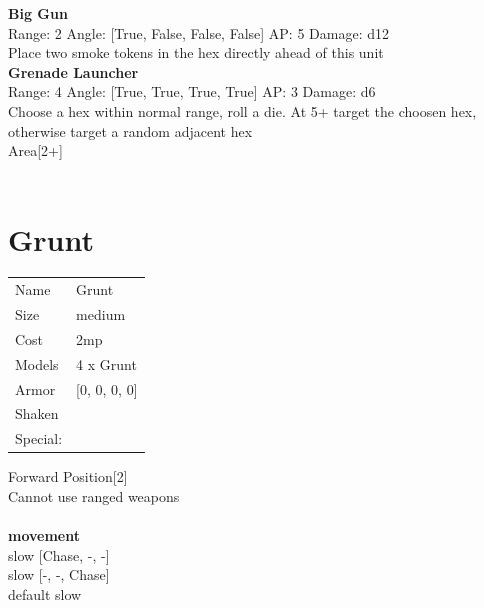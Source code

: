 {\bf Big Gun } \\



Range: 2  Angle: [True, False, False, False] AP: 5 Damage: d12 \\
Place two smoke tokens in the hex directly ahead of this unit\\ 




{\bf Grenade Launcher } \\



Range: 4  Angle: [True, True, True, True] AP: 3 Damage: d6 \\
Choose a hex within normal range, roll a die. At 5+ target the choosen hex, otherwise target a random adjacent hex\\ 
Area[2+]\\ 




 
\ \\













\clearpage

\section{ Grunt }

\begin{tabular}{ll}
  Name & Grunt \\
  Size & medium\\
  Cost & 2mp\\
  Models & 4 x Grunt\\
  Armor & [0, 0, 0, 0]\\
  Shaken & \\
  Special: \\
\end{tabular}

\noindent Forward Position[2]\\ 
Cannot use ranged weapons\\ 


\ \\ {\bf movement } \\
slow [Chase, -, -] \\
slow [-, -, Chase] \\
default slow \\


